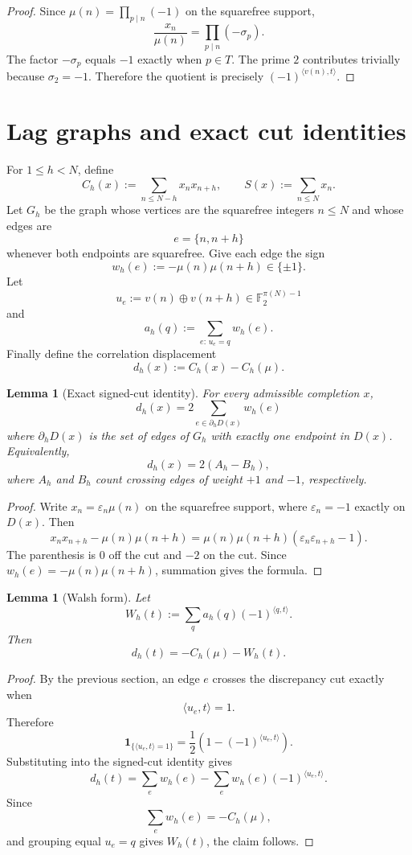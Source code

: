\documentclass[11pt]{article}
\newtheorem{lemma}[theorem]{Lemma}
\theoremstyle{definition}
\theoremstyle{remark}
\newcommand{\Ftwo}{\mathbb F_2}
\begin{document}
\begin{proof}
Since $\mu(n)=\prod_{p\mid n}(-1)$ on the squarefree support,
\[
\frac{x_n}{\mu(n)}
=\prod_{p\mid n}(-\sigma_p).
\]
The factor $-\sigma_p$ equals $-1$ exactly when $p\in T$.  The prime $2$ contributes trivially because $\sigma_2=-1$.  Therefore the quotient is precisely
$(-1)^{\langle v(n),t\rangle}$.
\end{proof}

\section{Lag graphs and exact cut identities}

For $1\le h<N$, define
\[
C_h(x):=\sum_{n\le N-h}x_nx_{n+h},
\qquad
S(x):=\sum_{n\le N}x_n.
\]
Let $G_h$ be the graph whose vertices are the squarefree integers $n\le N$ and whose edges are
\[
e=\{n,n+h\}
\]
whenever both endpoints are squarefree.  Give each edge the sign
\[
w_h(e):=-\mu(n)\mu(n+h)\in\{\pm1\}.
\]
Let
\[
u_e:=v(n)\oplus v(n+h)\in\Ftwo^{\pi(N)-1}
\]
and
\[
a_h(q):=\sum_{e:\,u_e=q}w_h(e).
\]
Finally define the correlation displacement
\[
d_h(x):=C_h(x)-C_h(\mu).
\]

\begin{lemma}[Exact signed-cut identity]
For every admissible completion $x$,
\[
\boxed{
 d_h(x)=2\sum_{e\in\partial_hD(x)}w_h(e)
}
\]
where $\partial_hD(x)$ is the set of edges of $G_h$ with exactly one endpoint in $D(x)$.  Equivalently,
\[
d_h(x)=2(A_h-B_h),
\]
where $A_h$ and $B_h$ count crossing edges of weight $+1$ and $-1$, respectively.
\end{lemma}

\begin{proof}
Write $x_n=\varepsilon_n\mu(n)$ on the squarefree support, where $\varepsilon_n=-1$ exactly on $D(x)$.  Then
\[
x_nx_{n+h}-\mu(n)\mu(n+h)
=\mu(n)\mu(n+h)(\varepsilon_n\varepsilon_{n+h}-1).
\]
The parenthesis is $0$ off the cut and $-2$ on the cut.  Since
$w_h(e)=-\mu(n)\mu(n+h)$, summation gives the formula.
\end{proof}

\begin{lemma}[Walsh form]
Let
\[
W_h(t):=\sum_q a_h(q)(-1)^{\langle q,t\rangle}.
\]
Then
\[
\boxed{\quad d_h(t)=-C_h(\mu)-W_h(t).\quad}
\]
\end{lemma}

\begin{proof}
By the previous section, an edge $e$ crosses the discrepancy cut exactly when
\[
\langle u_e,t\rangle=1.
\]
Therefore
\[
\mathbf 1_{\{\langle u_e,t\rangle=1\}}
=\frac12\left(1-(-1)^{\langle u_e,t\rangle}\right).
\]
Substituting into the signed-cut identity gives
\[
d_h(t)
=\sum_e w_h(e)-\sum_e w_h(e)(-1)^{\langle u_e,t\rangle}.
\]
Since
\[
\sum_e w_h(e)=-C_h(\mu),
\]
and grouping equal $u_e=q$ gives $W_h(t)$, the claim follows.
\end{proof}
\end{document}
